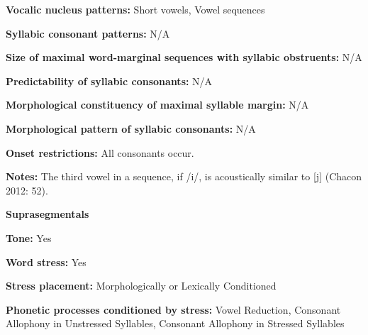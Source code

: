 \begin{styleBody}
\textbf{Vocalic nucleus patterns:} Short vowels, Vowel sequences
\end{styleBody}

\begin{styleBody}
\textbf{Syllabic consonant patterns:} N/A
\end{styleBody}

\begin{styleBody}
\textbf{Size of maximal word{}-marginal sequences with syllabic obstruents:} N/A
\end{styleBody}

\begin{styleBody}
\textbf{Predictability of syllabic consonants:} N/A
\end{styleBody}

\begin{styleBody}
\textbf{Morphological constituency of maximal syllable margin:} N/A
\end{styleBody}

\begin{styleBody}
\textbf{Morphological pattern of syllabic consonants:} N/A
\end{styleBody}

\begin{styleBody}
\textbf{Onset restrictions: }All consonants occur.
\end{styleBody}

\begin{styleBody}
\textbf{Notes: }The third vowel in a sequence, if /i/, is acoustically similar to [j] (Chacon 2012: 52).
\end{styleBody}

\begin{styleBody}
\textbf{Suprasegmentals}
\end{styleBody}

\begin{styleBody}
\textbf{Tone:} Yes
\end{styleBody}

\begin{styleBody}
\textbf{Word stress:} Yes
\end{styleBody}

\begin{styleBody}
\textbf{Stress placement:} Morphologically or Lexically Conditioned
\end{styleBody}

\begin{styleBody}
\textbf{Phonetic processes conditioned by stress:} Vowel Reduction, Consonant Allophony in Unstressed Syllables, Consonant Allophony in Stressed Syllables
\end{styleBody}

